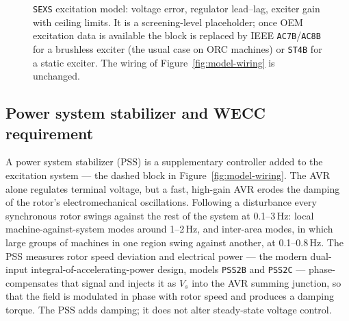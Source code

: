 \begin{figure}[htbp]
  \centering
  \caption{\texttt{SEXS} excitation model: voltage error, regulator lead--lag,
  exciter gain with ceiling limits. It is a screening-level placeholder; once
  OEM excitation data is available the block is replaced by IEEE
  \texttt{AC7B}/\texttt{AC8B} for a brushless exciter (the usual case on ORC
  machines) or \texttt{ST4B} for a static exciter. The wiring of
  Figure~\ref{fig:model-wiring} is unchanged.}
  \label{fig:sexs}
\end{figure}

\subsection{Power system stabilizer and WECC requirement}
\label{sec:pss}
A power system stabilizer (PSS) is a supplementary controller added to the
excitation system --- the dashed block in Figure~\ref{fig:model-wiring}. The AVR
alone regulates terminal voltage, but a fast, high-gain AVR erodes the damping
of the rotor's electromechanical oscillations. Following a disturbance every
synchronous rotor swings against the rest of the system at 0.1--3\,Hz: local
machine-against-system modes around 1--2\,Hz, and inter-area modes, in which
large groups of machines in one region swing against another, at 0.1--0.8\,Hz.
The PSS measures rotor speed deviation and electrical power --- the modern
dual-input integral-of-accelerating-power design, models \texttt{PSS2B} and
\texttt{PSS2C} --- phase-compensates that signal and injects it as $V_s$ into
the AVR summing junction, so that the field is modulated in phase with rotor
speed and produces a damping torque. The PSS adds damping; it does not alter
steady-state voltage control.

